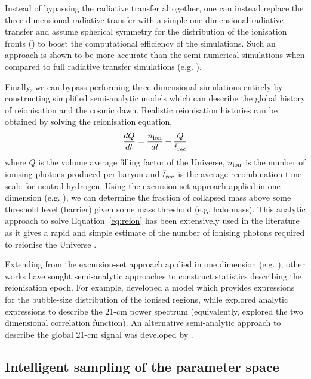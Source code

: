 Instead of bypassing the radiative transfer altogether, one can instead replace the three dimensional radiative transfer with a simple one dimensional radiative transfer and assume spherical symmetry for the distribution of the ionisation fronts (\cite{Thomas:2009,Ghara:2015}) to boost the computational efficiency of the simulations. Such an approach is shown to be more accurate than the semi-numerical simulations when compared to full radiative transfer simulations (e.g. \cite{Ghara:2018}).

Finally, we can bypass performing three-dimensional simulations entirely by constructing simplified semi-analytic models which can describe the global history of reionisation and the cosmic dawn. Realistic reionisation histories can be obtained by solving the reionisation equation,
\begin{eqnarray} \label{eq:reion}
\frac{dQ}{dt} = \frac{n_{\rm ion}}{dt} - \frac{Q}{\bar{t}_{\rm rec}}
\end{eqnarray}
where $Q$ is the volume average filling factor of the Universe, $n_{\rm ion}$ is the number of ionising photons produced per baryon and $\bar{t}_{\rm rec}$ is the average recombination time-scale for neutral hydrogen. Using the excursion-set approach applied in one dimension (e.g. \cite{Furlanetto:2004}), we can determine the fraction of collapsed mass above some threshold level (barrier) given some mass threshold (e.g. halo mass). This analytic approach to solve Equation~\ref{eq:reion} has been extensively used in the literature as it gives a rapid and simple estimate of the number of ionising photons required to reionise the Universe \cite{Choudhury:2005,Choudhury:2006,Haardt:2012,Kuhlen:2012,Bouwens:2015,Mitra:2015,Robertson:2015,Khaire:2016,Madau:2017,Mitra:2018,Finkelstein:2019,Mason:2019,Naidu:2019}.

Extending from the excursion-set approach applied in one dimension (e.g. \cite{Furlanetto:2004}), other works have sought semi-analytic approaches to construct statistics describing the reionisation epoch. For example, \cite{Paranjape:2014} developed a model which provides expressions for the bubble-size distribution of the ionised regions, while \cite{McQuinn:2005,McQuinn:2006} explored analytic expressions to describe the 21-cm power spectrum (equivalently, \cite{Barkana:2007} explored the two dimensional correlation function). An alternative semi-analytic approach to describe the global 21-cm signal was developed by \cite{Mirocha:2014,Mirocha:2017,Mirocha:2018}.

\subsection{Intelligent sampling of the parameter space} \label{sec:intel_samp}

